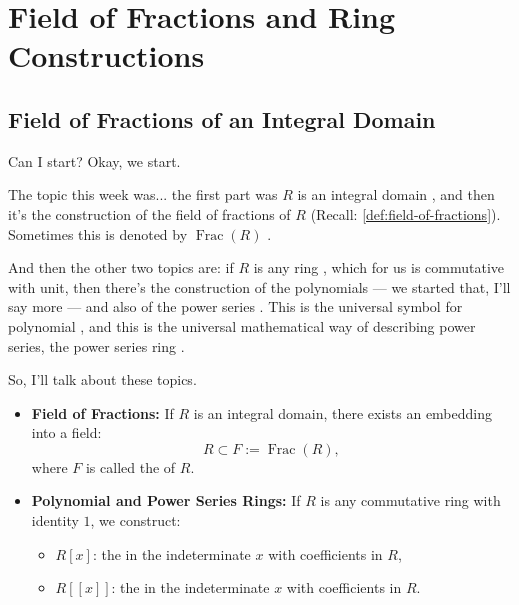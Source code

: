 \section{Field of Fractions and Ring Constructions}

\subsection{Field of Fractions of an Integral Domain}

\begin{speech}[00:00:00 - 00:01:00]
Can I start? Okay, we start.

The topic this week was... the first part was $R$ is an integral domain , and then it's the construction of the field of fractions  of $R$ (Recall: \cref{def:field-of-fractions}). Sometimes this is denoted by $\operatorname{Frac}(R)$ .

And then the other two topics are: if $R$ is any ring , which for us is commutative with unit, then there's the construction of the polynomials  --- we started that, I'll say more --- and also of the power series . This is the universal symbol for polynomial , and this is the universal mathematical way of describing power series, the power series ring .

So, I'll talk about these topics.
\end{speech}

\begin{content}
\begin{itemize}
    \item \textbf{Field of Fractions:} If $R$ is an integral domain, there exists an embedding into a field:
    \[
    R \subset F := \operatorname{Frac}(R),
    \]
    where $F$ is called the  of $R$.
    \item \textbf{Polynomial and Power Series Rings:} If $R$ is any commutative ring with identity $1$, we construct:
    \begin{itemize}
        \item $R[x]$: the  in the indeterminate $x$ with coefficients in $R$,
        \item $R[[x]]$: the  in the indeterminate $x$ with coefficients in $R$.
    \end{itemize}
\end{itemize}
\end{content}

